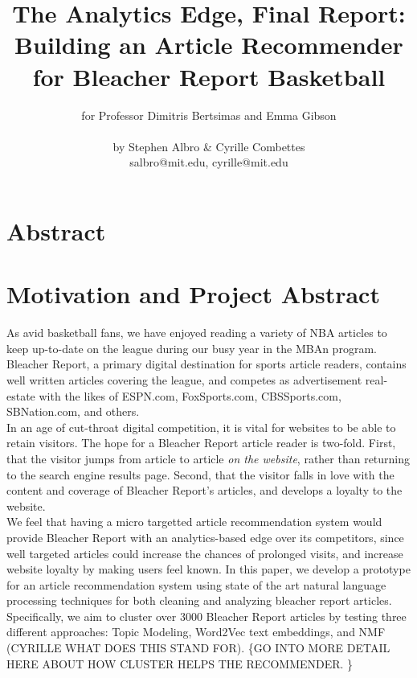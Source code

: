 \documentclass[11pt]{article}
\title{The Analytics Edge, Final Report:\\ Building an Article Recommender for Bleacher Report Basketball}
\author{for Professor Dimitris Bertsimas and Emma Gibson \text{ } \\ \\ by Stephen Albro \& Cyrille Combettes \\ salbro@mit.edu, cyrille@mit.edu}
\begin{document}
\maketitle{}


\section{Abstract}

\section{Motivation and Project Abstract}
As avid basketball fans, we have enjoyed reading a variety of NBA articles to keep up-to-date on the league during our busy year in the MBAn program.  Bleacher Report, a primary digital destination for sports article readers, contains well written articles covering the league, and competes as advertisement real-estate with the likes of ESPN.com, FoxSports.com, CBSSports.com, SBNation.com, and others. \\

  In an age of cut-throat digital competition, it is vital for websites to be able to retain visitors. The hope for a Bleacher Report article reader is two-fold. First, that the visitor jumps from article to article \textit{on the website}, rather than returning to the search engine results page.  Second, that the visitor falls in love with the content and coverage of Bleacher Report's articles, and develops a loyalty to the website. \\

We feel that having a micro targetted article recommendation system would provide Bleacher Report with an analytics-based edge over its competitors, since well targeted articles could increase the chances of prolonged visits, and increase website loyalty by making users feel known.  In this paper, we develop a prototype for an article recommendation system using state of the art natural language processing techniques for both cleaning and analyzing bleacher report articles.  Specifically, we aim to cluster over 3000 Bleacher Report articles by testing three different approaches: Topic Modeling, Word2Vec text embeddings, and NMF (CYRILLE WHAT DOES THIS STAND FOR).  \{GO INTO MORE DETAIL HERE ABOUT HOW CLUSTER HELPS THE RECOMMENDER. \}

\end{document}
